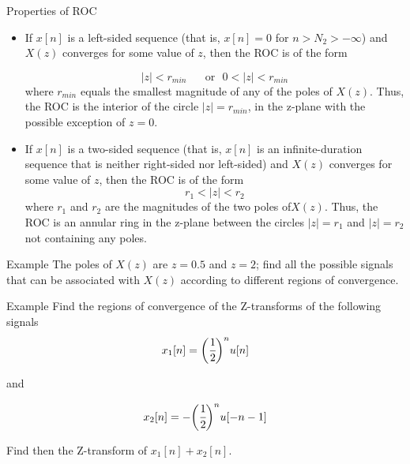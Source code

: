 \documentclass[aspectratio=169,xcolor=dvipsnames,svgnames,x11names,fleqn]{beamer}
\begin{document}
\begin{frame}{Properties of ROC}
    \begin{itemize}
        \item If $x[n]$ is a left-sided sequence (that is, $x[n] = 0$ for $n > N_2 > -\infty$) and $X(z)$ converges for some value of $z$, then the ROC is of the form 

$$
|z| < r_{min}\quad \textrm{~~or~~} 0 < |z| < r_{min}
$$
where $r_{min}$ equals the smallest magnitude of any of the poles of $X(z)$. Thus, the ROC is the interior of the circle $|z| = r_{min}$, in the z-plane with the possible exception of $z = 0$.

\item If $x[n]$ is a two-sided sequence (that is, $x[n]$ is an infinite-duration sequence that is neither right-sided nor left-sided) and $X(z)$ converges for some value of $z$, then the ROC is of the form 
$$
r_1 < |z| < r_2
$$
where $r_1$ and $r_2$ are the magnitudes of the two poles of$ X(z)$. Thus, the ROC is an annular ring in the z-plane between the circles $|z| = r_1$ and $|z|= r_2$ not containing any poles.
    \end{itemize}
\end{frame}

\begin{frame}{Example}
    The poles of $X(z)$ are $z = 0.5$ and $z = 2$; find all the possible signals that can be associated with $X(z)$ according to different regions of convergence.
    
\end{frame}

\begin{frame}{}
\vspace*{-9\baselineskip}
    \color{LightGray}{Blank space for calculation}
\end{frame}
\begin{frame}{}
\vspace*{-9\baselineskip}
    \color{LightGray}{Blank space for calculation}
\end{frame}
\begin{frame}{}
\vspace*{-9\baselineskip}
    \color{LightGray}{Blank space for calculation}
\end{frame}

\begin{frame}{Example}
    Find the regions of convergence of the Z-transforms of the following signals
    $$
    x_1[n] = \bigg(\cfrac{1}{2}\bigg)^n u[n]
    $$

    and

    $$
    x_2[n] = -\bigg(\cfrac{1}{2}\bigg)^n u[-n-1]
    $$

    Find then the Z-transform of $x_1[n] + x_2[n]$.
\end{frame}
\end{document}
